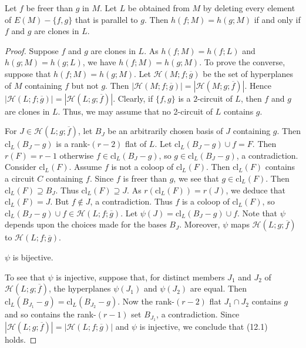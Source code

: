 \documentclass[10pt,a4paper]{amsart}
\newcommand{\cl}{\text{cl}}
\begin{document}
\begin{proposition}\label{hypclones}
    Let $f$ be freer than $g$ in $M$. Let $L$ be obtained from $M$ by deleting every element of $E(M)-\{f,g\}$ that is parallel to $g$. Then $h(f;M)=h(g;M)$ if and only if $f$ and $g$ are clones in $L$. 
\end{proposition}

\begin{proof}
    Suppose $f$ and $g$ are clones in $L$.
    As $h(f;M)=h(f;L)$ and $h(g;M)=h(g;L)$, we have $h(f;M)=h(g;M)$. 
    To prove the converse, suppose that $h(f;M)=h(g;M)$. 
    Let $\mathcal{H}(M;f;\overline g)$ be the set of hyperplanes of $M$ containing $f$ but not $g$. 
    Then $|\mathcal{H}(M;f;\overline g)|=|\mathcal{H}(M;g;\overline f)|$.
    Hence $|\mathcal{H}(L;f;\overline g)|=|\mathcal{H}(L;g;\overline f)|$.
    Clearly, if $\{f,g\}$ is a $2$-circuit of $L$, then $f$ and $g$ are clones in $L$. 
    Thus, we may assume that no 2-circuit of $L$ contains $g$.


    For $J\in \mathcal{H}(L;g;\overline f)$, let $B_J$ be an arbitrarily chosen basis of $J$ containing $g$. 
    Then $\cl_{L}(B_J-g)$ is a rank-$(r-2)$ flat of $L$. 
    Let $\cl_{L}(B_J-g)\cup f=F$. 
    Then $r(F)=r-1$ otherwise $f\in \cl_{L}(B_J-g)$, so $g\in \cl_{L}(B_J-g)$, a contradiction. 
    Consider $\cl_{L}(F)$. 
    Assume $f$ is not a coloop of $\cl_{L}(F)$. 
    Then $\cl_{L}(F)$ contains a circuit $C$ containing $f$. 
    Since $f$ is freer than $g$, we see that $g\in \cl_{L}(F)$. 
    Then $\cl_{L}(F)\supseteq B_J$. 
    Thus $\cl_{L}(F)\supseteq J$. 
    As $r(\cl_{L}(F))=r(J)$, we deduce that $\cl_{L}(F)=J$. 
    But $f\not\in J$, a contradiction. 
    Thus $f$ is a coloop of $\cl_{L}(F)$, so $\cl_{L}(B_J-g)\cup f\in \mathcal{H}(L;f;\overline g)$. 
    Let $\psi(J)=\cl_{L}(B_J-g)\cup f$. 
    Note that $\psi$ depends upon the choices made for the bases $B_J$. Moreover, $\psi$ maps $\mathcal{H}(L;g;\overline f)$ to $\mathcal{H}(L;f;\overline g )$.  

    \begin{sublemma}
       $\psi$ is bijective. 
    \end{sublemma}

    To see that $\psi$ is injective, suppose that, for distinct members $J_1$ and $J_2$ of $\mathcal{H}(L;g;\overline f)$, the hyperplanes $\psi(J_1)$ and $\psi(J_2)$ are equal. 
    Then $\cl_{L}(B_{J_1}-g)=\cl_{L}(B_{J_2}-g)$. 
    Now the rank-$(r-2)$ flat $J_1\cap J_2$ contains $g$ and so contains the rank-$(r-1)$ set $B_{J_1}$, a contradiction. 
    Since $|\mathcal{H}(L;g;\overline f)|=|\mathcal{H}(L;f;\overline g)|$ and $\psi$ is injective, we conclude that (12.1) holds.



\end{proof}
\end{document}
